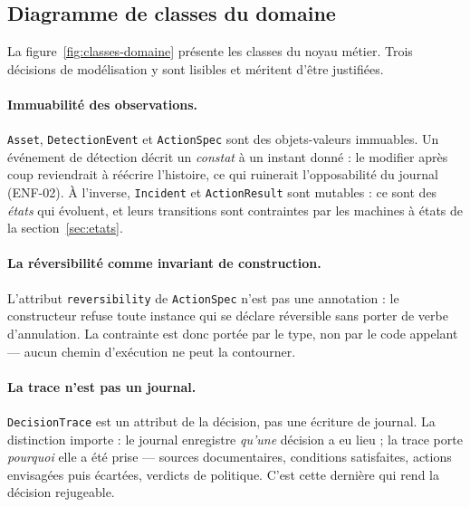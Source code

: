 \subsection{Diagramme de classes du domaine}
\label{sec:classes-domaine}
La figure~\ref{fig:classes-domaine} pr\'esente les classes du noyau m\'etier. Trois
d\'ecisions de mod\'elisation y sont lisibles et m\'eritent d'\^etre justifi\'ees.

\paragraph{Immuabilit\'e des observations.} \texttt{Asset}, \texttt{DetectionEvent}
et \texttt{ActionSpec} sont des objets-valeurs immuables. Un \'ev\'enement de
d\'etection d\'ecrit un \emph{constat} \`a un instant donn\'e : le modifier apr\`es coup
reviendrait \`a r\'e\'ecrire l'histoire, ce qui ruinerait l'opposabilit\'e du journal
(ENF-02). \`A l'inverse, \texttt{Incident} et \texttt{ActionResult} sont mutables :
ce sont des \emph{\'etats} qui \'evoluent, et leurs transitions sont contraintes par
les machines \`a \'etats de la section~\ref{sec:etats}.

\paragraph{La r\'eversibilit\'e comme invariant de construction.} L'attribut
\texttt{reversibility} de \texttt{ActionSpec} n'est pas une annotation : le
constructeur refuse toute instance qui se d\'eclare r\'eversible sans porter de
verbe d'annulation. La contrainte est donc port\'ee par le type, non par le code
appelant --- aucun chemin d'ex\'ecution ne peut la contourner.

\paragraph{La trace n'est pas un journal.} \texttt{DecisionTrace} est un attribut
de la d\'ecision, pas une \'ecriture de journal. La distinction importe : le journal
enregistre \emph{qu'une} d\'ecision a eu lieu ; la trace porte \emph{pourquoi} elle a
\'et\'e prise --- sources documentaires, conditions satisfaites, actions envisag\'ees
puis \'ecart\'ees, verdicts de politique. C'est cette derni\`ere qui rend la d\'ecision
rejugeable.

